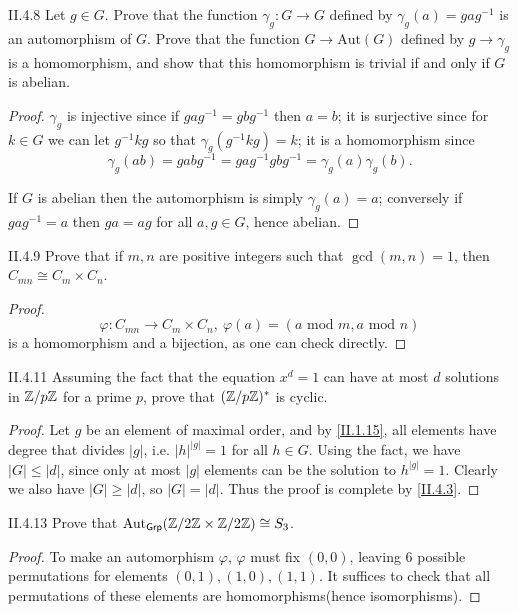 \begin{problem}{II.4.8}
Let $g \in G$. Prove that the function $\gamma_g:G \to G$ defined by $\gamma_g(a)=gag^{-1}$ is an automorphism of $G$. Prove that the function $G \to \text{Aut}(G)$ defined by $g \to \gamma_g$ is a homomorphism, and show that this homomorphism is trivial if and only if $G$ is abelian.
\end{problem}
\begin{proof}
$\gamma_g$ is injective since if $gag^{-1} = gbg^{-1}$ then $a = b$; it is surjective since for $k \in G$ we can let $g^{-1}kg$ so that $\gamma_g(g^{-1}kg) = k$; it is a homomorphism since \[\gamma_g(ab) = gabg^{-1} = gag^{-1}gbg^{-1} = \gamma_g(a)\gamma_g(b).\]

If $G$ is abelian then the automorphism is simply $\gamma_g(a)=a$; conversely if $gag^{-1} = a$ then $ga = ag$ for all $a, g \in G$, hence abelian.
\end{proof}

\begin{problem}{II.4.9}
Prove that if $m, n$ are positive integers such that $\gcd(m,n) = 1$, then $C_{mn} \cong C_m \times C_n$.
\end{problem}
\begin{proof}
\[
\varphi:C_{mn} \to C_m \times C_n ,\: \varphi(a) = (a \text{ mod } m, a \text{ mod } n)
\]
is a homomorphism and a bijection, as one can check directly.
\end{proof}

\begin{problem}{II.4.11}
Assuming the fact that the equation $x^d = 1$ can have at most $d$ solutions in $\mathbb{Z}/p\mathbb{Z}$ for a prime $p$, prove that $(\mathbb{Z}/p\mathbb{Z})^*$ is cyclic.
\end{problem}
\begin{proof}
Let $g$ be an element of maximal order, and by \ref{II.1.15}, all elements have degree that divides $|g|$, i.e. $|h|^{|g|} = 1$ for all $h \in G$. Using the fact, we have $|G| \leq |d|$, since only at most $|g|$ elements can be the solution to $h^{|g|} = 1$. Clearly we also have $|G| \geq |d|$, so $|G| = |d|$. Thus the proof is complete by \ref{II.4.3}.
\end{proof}

\begin{problem}{II.4.13}
Prove that $\text{Aut}_\textsf{Grp}(\mathbb{Z}/2\mathbb{Z} \times \mathbb{Z}/2\mathbb{Z}) \cong S_3$.
\end{problem}
\begin{proof}
To make an automorphism $\varphi$, $\varphi$ must fix $(0,0)$, leaving 6 possible permutations for elements $(0,1), (1,0), (1,1)$. It suffices to check that all permutations of these elements are homomorphisms(hence isomorphisms). 
\end{proof}


